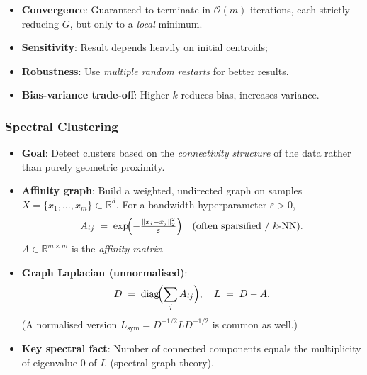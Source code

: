 \begin{itemize}
    \item \textbf{Convergence}: Guaranteed to terminate in
          $\mathcal{O}(m)$ iterations, each strictly reducing $G$,
          but only to a \emph{local} minimum.
    \item \textbf{Sensitivity}: Result depends heavily on
          initial centroids;
    \item \textbf{Robustness}: Use \emph{multiple random restarts} for better results.
    \item \textbf{Bias-variance trade-off}: Higher $k$ reduces bias, increases variance.
\end{itemize}

\subsubsection{Spectral Clustering}
\revisit
\begin{itemize}
    \item \textbf{Goal}: Detect clusters based on the \emph{connectivity structure}
          of the data rather than purely geometric proximity.
    \item \textbf{Affinity graph}: Build a weighted, undirected graph
          on samples $X=\{x_1,\dots,x_m\}\subset \mathbb{R}^{d}$.
          For a bandwidth hyperparameter $\varepsilon>0$,
          \[
              A_{ij} \;=\;
              \exp\!\Bigl(-\tfrac{\|x_i-x_j\|_2^{2}}{\varepsilon}\Bigr)
              \quad(\text{often sparsified / $k$-NN}).
          \]
          $A\in\mathbb{R}^{m\times m}$ is the \emph{affinity matrix}.
    \item \textbf{Graph Laplacian (unnormalised)}:
          \[
              D \;=\; \operatorname{diag}\!\Bigl(\sum_{j}A_{ij}\Bigr),
              \quad
              L \;=\; D - A .
          \]
          (A normalised version $L_{\text{sym}}=D^{-1/2}LD^{-1/2}$ is common as well.)
    \item \textbf{Key spectral fact}:
          Number of connected components equals the multiplicity
          of eigenvalue $0$ of $L$ (spectral graph theory).
\end{itemize}

